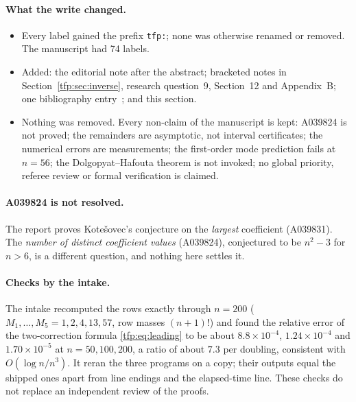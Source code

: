 \documentclass[11pt,a4paper]{article}
\numberwithin{equation}{section}
\theoremstyle{definition}\newtheorem{definition}[theorem]{Definition}
\theoremstyle{remark}\newtheorem{remark}[theorem]{Remark}
\begin{document}
\paragraph{What the write changed.}
\begin{itemize}
\item Every label gained the prefix \texttt{tfp:}; none was otherwise
 renamed or removed. The manuscript had 74 labels.
\item Added: the editorial note after the abstract; bracketed notes in
 Section~\ref{tfp:sec:inverse}, research question~9, Section~12 and
 Appendix~B; one bibliography entry~\cite{tai}; and this section.
\item Nothing was removed. Every non-claim of the manuscript is kept:
 A039824 is not proved; the remainders are asymptotic, not interval
 certificates; the numerical errors are measurements; the first-order mode
 prediction fails at $n=56$; the Dolgopyat--Hafouta theorem is not invoked;
 no global priority, referee review or formal verification is claimed.
\end{itemize}

\paragraph{A039824 is not resolved.}
The report proves Kote\v{s}ovec's conjecture on the \emph{largest}
coefficient (A039831). The \emph{number of distinct coefficient values}
(A039824), conjectured to be $n^2-3$ for $n>6$, is a different question, and
nothing here settles it.

\paragraph{Checks by the intake.}
The intake recomputed the rows exactly through $n=200$ ($M_1,\ldots,M_5=1,2,4,13,57$,
row masses $(n+1)!$) and found the relative error of the two-correction
formula \eqref{tfp:eq:leading} to be about $8.8\times10^{-4}$,
$1.24\times10^{-4}$ and $1.70\times10^{-5}$ at $n=50,100,200$, a ratio of
about $7.3$ per doubling, consistent with $O(\log n/n^3)$. It reran the three
programs on a copy; their outputs equal the shipped ones apart from line
endings and the elapsed-time line. These checks do not replace an
independent review of the proofs.
\end{document}
